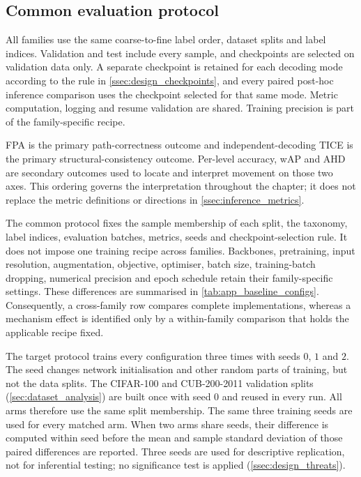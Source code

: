 \subsection{Common evaluation protocol}
\label{ssec:fidelity_protocol}

All families use the same coarse-to-fine label order, dataset splits
and label indices. Validation and test include every sample, and checkpoints are
selected on validation data only. A separate checkpoint is retained for each
decoding mode according to the rule in \cref{ssec:design_checkpoints}, and every
paired post-hoc inference comparison uses the checkpoint selected for that same
mode. Metric computation, logging and resume validation are shared. Training
precision is part of the family-specific recipe.

FPA is the primary path-correctness outcome and independent-decoding TICE is the
primary structural-consistency outcome. Per-level accuracy, wAP and AHD are
secondary outcomes used to locate and interpret movement on those two axes.
This ordering governs the interpretation throughout the chapter; it does not
replace the metric definitions or directions in \cref{ssec:inference_metrics}.

The common protocol fixes the sample membership of each split, the taxonomy,
label indices, evaluation batches, metrics, seeds and checkpoint-selection
rule. It does not impose one training recipe across families. Backbones,
pretraining, input resolution, augmentation, objective, optimiser, batch size,
training-batch dropping, numerical precision and epoch schedule retain their
family-specific settings. These differences are summarised in
\cref{tab:app_baseline_configs}. Consequently, a cross-family row compares
complete implementations, whereas a mechanism effect is identified only by a
within-family comparison that holds the applicable recipe fixed.

The target protocol trains every configuration three times with seeds $0$, $1$
and $2$. The seed changes network initialisation and other random parts of training, but not
the data splits. The CIFAR-100 and CUB-200-2011 validation splits
(\cref{sec:dataset_analysis}) are built once with seed $0$ and reused in every
run. All arms therefore use the same split membership. The same three training
seeds are used for every matched arm. When two arms share seeds, their difference is computed
within seed before the mean and sample standard deviation of those paired
differences are reported. Three seeds are used for descriptive replication, not
for inferential testing; no significance test is applied
(\cref{ssec:design_threats}).

